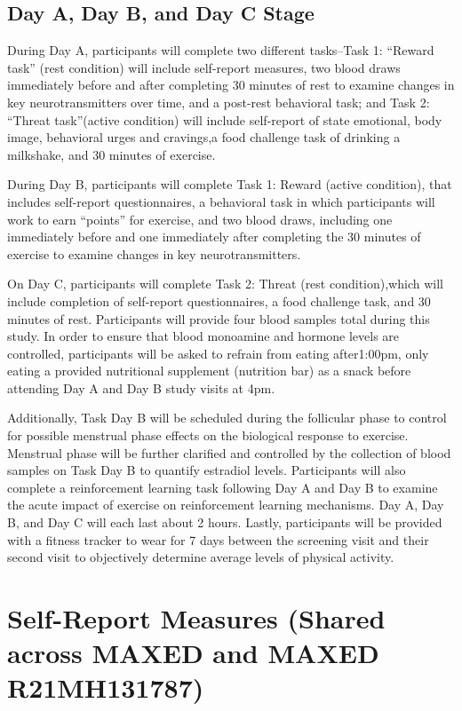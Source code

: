 \documentclass[
]{book}
\begin{document}
\section{Day A, Day B, and Day C Stage}\label{day-a-day-b-and-day-c-stage}

During Day A, participants will complete two different tasks--Task 1: ``Reward task'' (rest condition) will include self-report measures, two blood draws immediately before and after completing 30 minutes of rest to examine changes in key neurotransmitters over time, and a post-rest behavioral task; and Task 2: ``Threat task''(active condition) will include self-report of state emotional, body image, behavioral urges and cravings,a food challenge task of drinking a milkshake, and 30 minutes of exercise.

During Day B, participants will complete Task 1: Reward (active condition), that includes self-report questionnaires, a behavioral task in which participants will work to earn ``points'' for exercise, and two blood draws, including one immediately before and one immediately after completing the 30 minutes of exercise to examine changes in key neurotransmitters.

On Day C, participants will complete Task 2: Threat (rest condition),which will include completion of self-report questionnaires, a food challenge task, and 30 minutes of rest. Participants will provide four blood samples total during this study. In order to ensure that blood monoamine and hormone levels are controlled, participants will be asked to refrain from eating after1:00pm, only eating a provided nutritional supplement (nutrition bar) as a snack before attending Day A and Day B study visits at 4pm.

Additionally, Task Day B will be scheduled during the follicular phase to control for possible menstrual phase effects on the biological response to exercise. Menstrual phase will be further clarified and controlled by the collection of blood samples on Task Day B to quantify estradiol levels. Participants will also complete a reinforcement learning task following Day A and Day B to examine the acute impact of exercise on reinforcement learning mechanisms. Day A, Day B, and Day C will each last about 2 hours. Lastly, participants will be provided with a fitness tracker to wear for 7 days between the screening visit and their second visit to objectively determine average levels of physical activity.

\chapter{Self-Report Measures (Shared across MAXED and MAXED R21MH131787)}\label{self-report-measures-shared-across-maxed-and-maxed-r21mh131787}
\end{document}
